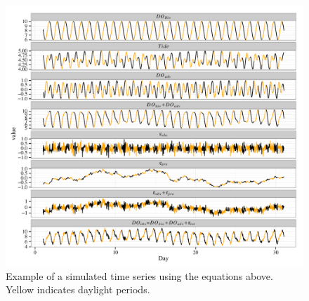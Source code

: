 \documentclass{article}\usepackage{graphicx, color}
\makeatletter
\def\maxwidth{ %
  \ifdim\Gin@nat@width>\linewidth
    \linewidth
  \else
    \Gin@nat@width
  \fi
}
\newenvironment{knitrout}{}{} %
\makeatother
\begin{document}
\begin{knitrout}
\color{fgcolor}\begin{figure}[!h]


{\centering \includegraphics[width=\maxwidth]{figure/do_sim} 

}

\caption[Example of a simulated time series using the equations above]{Example of a simulated time series using the equations above.  Yellow indicates daylight periods.\label{fig:do_sim}}
\end{figure}


\end{knitrout}

\clearpage
\end{document}

